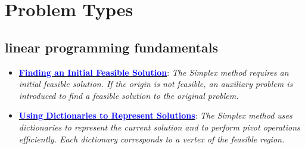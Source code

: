 \documentclass{article}%
\begin{document}
\section{Problem Types}%
\label{sec:ProblemTypes}%
\begin{itemize}[leftmargin=*]%
\subsection{linear programming fundamentals}%
\label{subsec:linearprogrammingfundamentals}%
\begin{itemize}[leftmargin=*]%
\item \href{https://www.math.purdue.edu/~yipn/421/2024-08-27-ExSimplex.pdf#page=32}{\textbf{\textcolor{blue}{Finding an Initial Feasible Solution}}}: \emph{The Simplex method requires an initial feasible solution. If the origin is not feasible, an auxiliary problem is introduced to find a feasible solution to the original problem.}%
\item \href{https://www.math.purdue.edu/~yipn/421/2024-08-27-ExSimplex.pdf#page=26}{\textbf{\textcolor{blue}{Using Dictionaries to Represent Solutions}}}: \emph{The Simplex method uses dictionaries to represent the current solution and to perform pivot operations efficiently. Each dictionary corresponds to a vertex of the feasible region.}%
\end{itemize}

%

\end{itemize}
\end{document}
